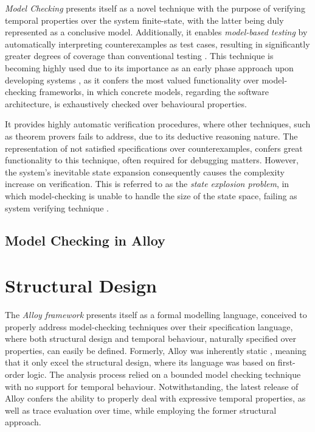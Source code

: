 \textit{Model Checking} presents itself as a novel technique with the purpose of verifying temporal properties over the system finite-state, with the latter being duly represented as a conclusive model. Additionally, it enables \textit{model-based testing} by automatically interpreting counterexamples as test cases, resulting in significantly greater degrees of coverage than conventional testing \cite{fraser2009testing, beyer2017software}. This technique is becoming highly used due to its importance as an early phase approach upon developing systems \cite{lwspecification}, as it confers the most valued functionality over model-checking frameworks, in which concrete models, regarding the software architecture, is exhaustively checked over behavioural properties. 

It provides highly automatic verification procedures, where other techniques, such as theorem provers fails to address, due to its deductive reasoning nature. The representation of not satisfied specifications over counterexamples, confers great functionality to this technique, often required for debugging matters.
However, the system's inevitable state expansion consequently causes the complexity increase on verification. This is referred to as the \textit{state explosion problem}, in which model-checking is unable to handle the size of the state space, failing as system verifying technique \cite{clarke2011model, clarke1997model}. 


\subsection{Model Checking in Alloy}


\section{Structural Design}

The \textit{Alloy framework} presents itself as a formal modelling language, conceived to properly address model-checking techniques over their specification language, where both structural design and temporal behaviour, naturally specified over properties, can easily be defined. Formerly, Alloy was inherently static \cite{lwspecification}, meaning that it only excel the structural design, where its language was based on first-order logic. The analysis process relied on a bounded model checking technique with no support for temporal behaviour. Notwithstanding, the latest release of Alloy confers the ability to properly deal with expressive temporal properties, as well as trace evaluation over time, while employing the former structural approach. 

